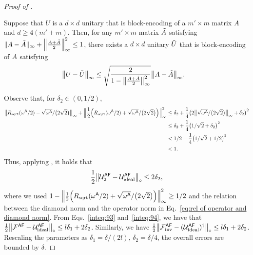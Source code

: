 \begin{proof}[Proof of ]
\begin{lemma}
\label{prevthm:robustness BE unitary}
Suppose that $U$ is a $d \times d$ unitary that is block-encoding of a $m' \times m$ matrix $A$ and $d \geq 4(m'+m)$. Then, for any $m' \times m$ matrix $\tilde{A}$ satisfying $\|A-\tilde{A}\|_\infty + \Big\|\frac{A+\tilde{A}}{2}\Big\|_\infty^2 \leq 1$, there exists a $d \times d$ unitary $\tilde{U}$ that is block-encoding of $\tilde{A}$ satisfying
\begin{align}
    \big\|U - \tilde{U}\big\|_\infty &\leq \sqrt{\frac{2}{1-\big\|\frac{A+\tilde{A}}{2}\big\|_\infty^2}}\big\|A-\tilde{A}\big\|_\infty.
\end{align}  
\end{lemma}


Observe that, for $\delta_2 \in (0, 1/2)$,
\begin{align}
    \big\|R_{\rm sqrt}(\omega^{\mathsf{A}}/2) - \sqrt{\omega^{\mathsf{A}}}/\big(2\sqrt{2}\big)\big\|_\infty + \Big\|\frac{1}{2}\Big(R_{\rm sqrt}(\omega^{\mathsf{A}}/2) + \sqrt{\omega^{\mathsf{A}}}/\big(2\sqrt{2}\big)\Big)\Big\|_\infty^2 
    &\leq \delta_2 + \frac{1}{4}\big(2\big\|\sqrt{\omega^{\mathsf{A}}}/\big(2\sqrt{2}\big)\big\|_\infty + \delta_2\big)^2 \\
    &\leq \delta_2 + \frac{1}{4}\big(1/\sqrt{2} + \delta_2\big)^2 \\
    &< 1/2 + \frac{1}{4}\big(1/\sqrt{2} + 1/2\big)^2 \\
    &< 1.
\end{align}
Thus, applying , it holds that 
\begin{equation}
\label{inteq:94}
    \frac{1}{2}\big\|{\mathcal{U}}_2^{{\mathsf{A}}{\mathsf{F}}} - {\mathcal{U}}_{\rm ideal}^{{\mathsf{A}}{\mathsf{F}}}\big\|_\diamond \leq 2 \delta_2,
\end{equation}
where we used $1-\Big\|\frac{1}{2}\Big(R_{\rm sqrt}(\omega^{\mathsf{A}}/2) + \sqrt{\omega^{\mathsf{A}}}/\big(2\sqrt{2}\big)\Big)\Big\|_\infty^2 \geq 1/2$ and the relation between the diamond norm and the operator norm in Eq.~\eqref{eq:rel of operator and diamond norm}.
From Eqs.~\eqref{inteq:93} and~\eqref{inteq:94}, we have that $\frac{1}{2}\big\|{\mathcal{F}}^{{\mathsf{A}}{\mathsf{F}}} - {\mathcal{U}}_{\rm ideal}^{{\mathsf{A}}{\mathsf{F}}}\big\|_\diamond \leq l\delta_1 + 2\delta_2$.
Similarly, we have $\frac{1}{2}\big\|{\mathcal{F}}_{\rm inv}^{{\mathsf{A}}{\mathsf{F}}} - ({\mathcal{U}}_{\rm ideal}^{{\mathsf{A}}{\mathsf{F}}})^\dag\big\|_\diamond \leq l\delta_1 + 2\delta_2$.
Rescaling the parameters as $\delta_1 = \delta/(2l)$, $\delta_2 = \delta/4$, the overall errors are bounded by $\delta$.


\end{proof}
